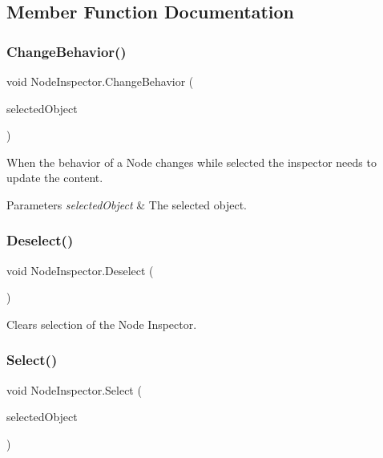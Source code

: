 \subsection{Member Function Documentation}
\mbox{\label{class_node_inspector_a622010fcd39b4bee19087e238b9574d6}} 
\subsubsection{\texorpdfstring{Change\+Behavior()}{ChangeBehavior()}}
{\footnotesize\ttfamily void Node\+Inspector.\+Change\+Behavior (\begin{DoxyParamCaption}\item[{Game\+Object}]{selected\+Object }\end{DoxyParamCaption})}



When the behavior of a Node changes while selected the inspector needs to update the content. 


\begin{DoxyParams}{Parameters}
{\em selected\+Object} & The selected object. \\
\hline
\end{DoxyParams}
\mbox{\label{class_node_inspector_a553862e69d98c5b5528871e1e3a18ad1}} 
\subsubsection{\texorpdfstring{Deselect()}{Deselect()}}
{\footnotesize\ttfamily void Node\+Inspector.\+Deselect (\begin{DoxyParamCaption}{ }\end{DoxyParamCaption})}



Clears selection of the Node Inspector. 

\mbox{\label{class_node_inspector_af14ce741da70a5d25865c72b6dc9291b}} 
\subsubsection{\texorpdfstring{Select()}{Select()}}
{\footnotesize\ttfamily void Node\+Inspector.\+Select (\begin{DoxyParamCaption}\item[{Game\+Object}]{selected\+Object }\end{DoxyParamCaption})}



